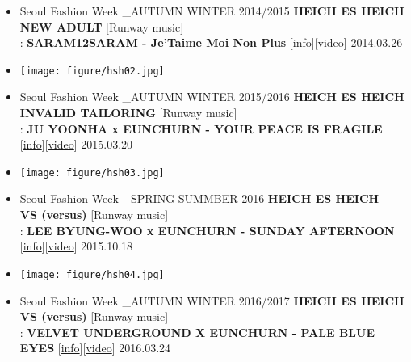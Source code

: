 \begin{itemize}
\item Seoul Fashion Week \_AUTUMN WINTER 2014/2015 \textbf{HEICH ES HEICH}\\ \textbf{NEW ADULT} [Runway music]\\: \textbf{SARAM12SARAM - Je'Taime Moi Non Plus} [\href{http://heich.kr/}{\footnotesize{info}}][\href{https://www.youtube.com/watch?v=MF40OFD6PGQ}{\footnotesize{video}}] \hfill 2014.03.26
\item \texttt{[image: figure/hsh02.jpg]}
\item Seoul Fashion Week \_AUTUMN WINTER 2015/2016 \textbf{HEICH ES HEICH}\\ \textbf{INVALID TAILORING} [Runway music]\\: \textbf{JU YOONHA x EUNCHURN - YOUR PEACE IS FRAGILE} [\href{https://soundcloud.com/eunchurn/your-peace-is-fragile-remember0416?in=eunchurn/sets/heich-es-heich-collection}{\footnotesize{info}}][\href{https://www.youtube.com/watch?v=RXh5Wxi2nB8}{\footnotesize{video}}] \hfill 2015.03.20
\item \texttt{[image: figure/hsh03.jpg]}
\item Seoul Fashion Week \_SPRING SUMMBER 2016 \textbf{HEICH ES HEICH}\\ \textbf{VS (versus)} [Runway music]\\: \textbf{LEE BYUNG-WOO x EUNCHURN - SUNDAY AFTERNOON} [\href{https://soundcloud.com/eunchurn/leebyungwoo-x-eunchurn-sunday-afternoon-heich-es-heich-collection?in=eunchurn/sets/heich-es-heich-collection}{\footnotesize{info}}][\href{https://www.youtube.com/watch?v=DhkkjakNuBY}{\footnotesize{video}}] \hfill 2015.10.18
\item \texttt{[image: figure/hsh04.jpg]}
\item Seoul Fashion Week \_AUTUMN WINTER 2016/2017 \textbf{HEICH ES HEICH}\\ \textbf{VS (versus)} [Runway music]\\: \textbf{VELVET UNDERGROUND X EUNCHURN - PALE BLUE EYES} [\href{https://soundcloud.com/eunchurn/velvet-underground-x-eunchurn-pale-blue-eyes-heich-es-heich-aw-2016-2017?in=eunchurn/sets/heich-es-heich-collection}{\footnotesize{info}}][\href{https://www.youtube.com/watch?v=XlTF2bCQ4lQ}{\footnotesize{video}}] \hfill 2016.03.24

\end{itemize}

